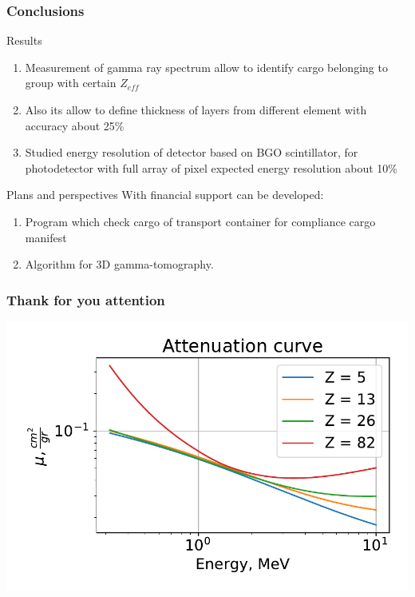 \documentclass[11pt]{beamer}
\begin{document}
\begin{frame}
    \frametitle{Conclusions}
    
    \begin{block}{Results}%
    \begin{enumerate}
        \item Measurement of gamma ray spectrum allow to identify cargo belonging to group with certain $Z_{eff}$ 
        \item Also its allow to define thickness of layers from different element with accuracy about 25\% 
        \item Studied energy resolution of detector based on BGO scintillator, for photodetector with full array of pixel expected energy resolution about 10\%
    \end{enumerate}
    \end{block}
\begin{block}{Plans and perspectives}%
    With financial support can be developed:
    \begin{enumerate}
        \item Program which check cargo of transport container   for compliance cargo manifest
        \item Algorithm for 3D gamma-tomography.
    \end{enumerate}
\end{block}

\end{frame}

\begin{frame}
    \frametitle{Thank for you attention}
            \includegraphics[width=1\textwidth]{figures/Attenuation.pdf}
\end{frame}
\end{document}

